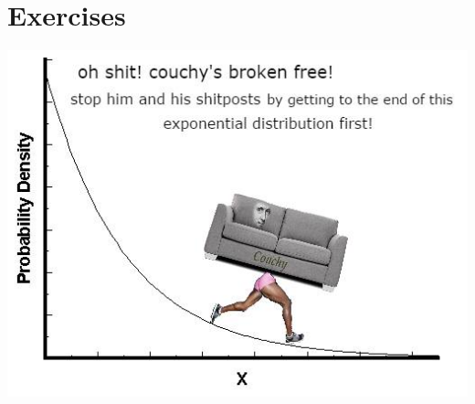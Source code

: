 \documentclass{article}
\begin{document}

\section{Exercises}
\newpage

\includegraphics[scale=0.6]{couchy.jpg}
\end{document}
